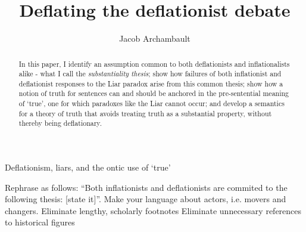 \documentclass[]{article}
\title{Deflating the deflationist debate}
\author{Jacob Archambault}
\begin{document}
\maketitle

\begin{abstract}
In this paper, I identify an assumption common to both deflationists and inflationalists alike - what I call the \textit{substantiality thesis}; show how failures of both inflationist and deflationist responses to the Liar paradox arise from this common thesis; show how a notion of truth for sentences can and should be anchored in the pre-sentential meaning of ‘true’, one for which paradoxes like the Liar cannot occur; and develop a semantics for a theory of truth that avoids treating truth as a substantial property, without thereby being deflationary.
\end{abstract}

\section{}
Deflationism, liars, and the ontic use of ‘true’


Rephrase as follows: “Both inflationists and deflationists are commited to the following thesis: [state it]”. Make your language about actors, i.e. movers and changers. 
Eliminate lengthy, scholarly footnotes
Eliminate unnecessary references to historical figures
\end{document}
